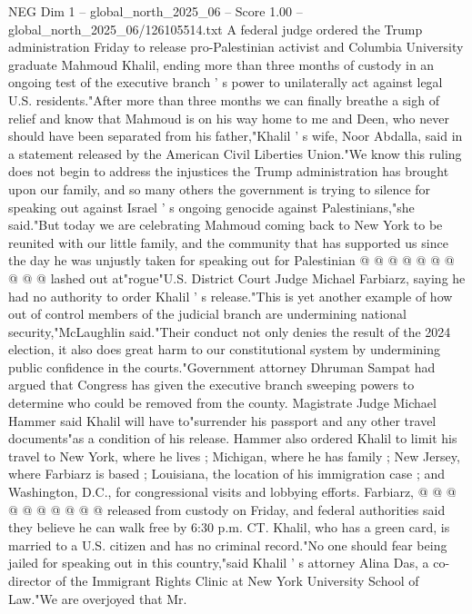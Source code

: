\begin{textsample}{NEG Dim 1 – global\_north\_2025\_06 – Score 1.00 – global\_north\_2025\_06/126105514.txt}  \label{ex:f1_neg_146}
A federal judge ordered the Trump administration Friday to release pro-Palestinian activist and Columbia University graduate Mahmoud Khalil, ending more than three months of custody in an ongoing test of the executive branch ' s power to unilaterally act against legal U.S. residents."After more than three months we can finally breathe a sigh of relief and know that Mahmoud is on his way home to me and Deen, who never should have been separated from his father,"Khalil ' s wife, Noor Abdalla, said in a statement released by the American Civil Liberties Union."We know this ruling does not begin to address the injustices the Trump administration has brought upon our family, and so many others the government is trying to silence for speaking out against Israel ' s ongoing genocide against Palestinians,"she said."But today we are celebrating Mahmoud coming back to New York to be reunited with our little family, and the community that has supported us since the day he was unjustly taken for speaking out for Palestinian @ @ @ @ @ @ @ @ @ @ lashed out at"rogue"U.S.
District Court Judge Michael Farbiarz, saying he had no authority to order Khalil ' s release."This is yet another example of how out of control members of the judicial branch are undermining national security,"McLaughlin said."Their conduct not only denies the result of the 2024 election, it also does great harm to our constitutional system by undermining public confidence in the courts."Government attorney Dhruman Sampat had argued that Congress has given the executive branch sweeping powers to determine who could be removed from the county.
Magistrate Judge Michael Hammer said Khalil will have to"surrender his passport and any other travel documents"as a condition of his release.
Hammer also ordered Khalil to limit his travel to New York, where he lives ; Michigan, where he has family ; New Jersey, where Farbiarz is based ; Louisiana, the location of his immigration case ; and Washington, D.C., for congressional visits and lobbying efforts.
Farbiarz, @ @ @ @ @ @ @ @ @ @ released from custody on Friday, and federal authorities said they believe he can walk free by 6:30 p.m.
CT.
Khalil, who has a green card, is married to a U.S. citizen and has no criminal record."No one should fear being jailed for speaking out in this country,"said Khalil ' s attorney Alina Das, a co-director of the Immigrant Rights Clinic at New York University School of Law."We are overjoyed that Mr.

\end{textsample}
